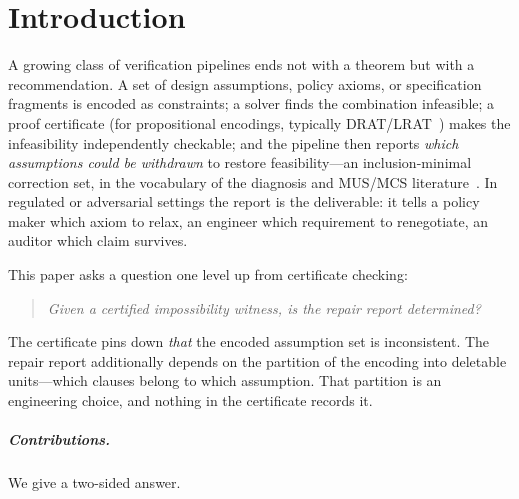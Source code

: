 \documentclass[sigplan,10pt,review,anonymous,nonacm]{acmart}
\theoremstyle{acmdefinition}
\begin{document}
\section{Introduction}
\label{sec:intro}

A growing class of verification pipelines ends not with a theorem but with a
recommendation. A set of design assumptions, policy axioms, or specification
fragments is encoded as constraints; a solver finds the combination
infeasible; a proof certificate (for propositional encodings, typically
DRAT/LRAT~\cite{WetzlerHeuleHunt2014,CruzFilipe2017}) makes the
infeasibility independently checkable; and the pipeline then reports
\emph{which assumptions could be withdrawn} to restore feasibility---an
inclusion-minimal correction set, in the vocabulary of the diagnosis and
MUS/MCS literature~\cite{Reiter1987,LiffitonSakallah2008}. In regulated or
adversarial settings the report is the deliverable: it tells a policy maker
which axiom to relax, an engineer which requirement to renegotiate, an auditor
which claim survives.

This paper asks a question one level up from certificate checking:
\begin{quote}
\emph{Given a certified impossibility witness, is the repair report
determined?}
\end{quote}
The certificate pins down \emph{that} the encoded assumption set is
inconsistent. The repair report additionally depends on the partition of the
encoding into deletable units---which clauses belong to which assumption. That
partition is an engineering choice, and nothing in the certificate records it.

\subparagraph*{Contributions.} We give a two-sided answer.
\end{document}
